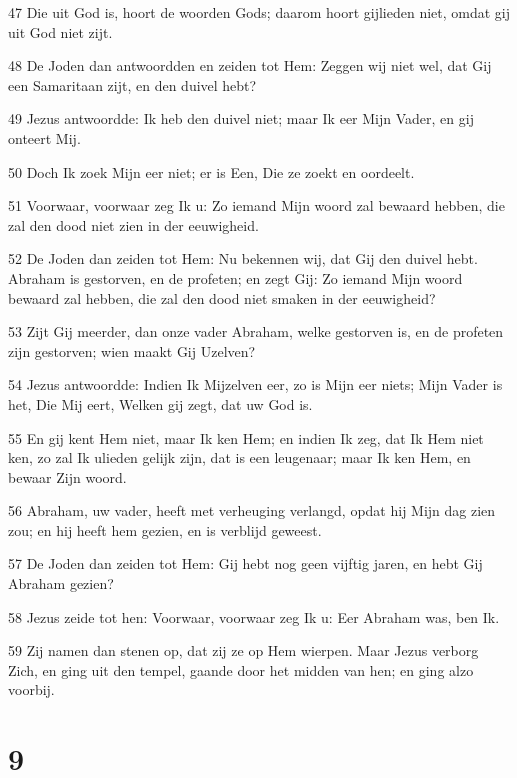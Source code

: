 \par 47 Die uit God is, hoort de woorden Gods; daarom hoort gijlieden niet, omdat gij uit God niet zijt.
\par 48 De Joden dan antwoordden en zeiden tot Hem: Zeggen wij niet wel, dat Gij een Samaritaan zijt, en den duivel hebt?
\par 49 Jezus antwoordde: Ik heb den duivel niet; maar Ik eer Mijn Vader, en gij onteert Mij.
\par 50 Doch Ik zoek Mijn eer niet; er is Een, Die ze zoekt en oordeelt.
\par 51 Voorwaar, voorwaar zeg Ik u: Zo iemand Mijn woord zal bewaard hebben, die zal den dood niet zien in der eeuwigheid.
\par 52 De Joden dan zeiden tot Hem: Nu bekennen wij, dat Gij den duivel hebt. Abraham is gestorven, en de profeten; en zegt Gij: Zo iemand Mijn woord bewaard zal hebben, die zal den dood niet smaken in der eeuwigheid?
\par 53 Zijt Gij meerder, dan onze vader Abraham, welke gestorven is, en de profeten zijn gestorven; wien maakt Gij Uzelven?
\par 54 Jezus antwoordde: Indien Ik Mijzelven eer, zo is Mijn eer niets; Mijn Vader is het, Die Mij eert, Welken gij zegt, dat uw God is.
\par 55 En gij kent Hem niet, maar Ik ken Hem; en indien Ik zeg, dat Ik Hem niet ken, zo zal Ik ulieden gelijk zijn, dat is een leugenaar; maar Ik ken Hem, en bewaar Zijn woord.
\par 56 Abraham, uw vader, heeft met verheuging verlangd, opdat hij Mijn dag zien zou; en hij heeft hem gezien, en is verblijd geweest.
\par 57 De Joden dan zeiden tot Hem: Gij hebt nog geen vijftig jaren, en hebt Gij Abraham gezien?
\par 58 Jezus zeide tot hen: Voorwaar, voorwaar zeg Ik u: Eer Abraham was, ben Ik.
\par 59 Zij namen dan stenen op, dat zij ze op Hem wierpen. Maar Jezus verborg Zich, en ging uit den tempel, gaande door het midden van hen; en ging alzo voorbij.

\chapter{9}

